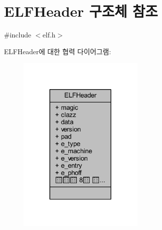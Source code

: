 \hypertarget{struct_e_l_f_header}{}\section{E\+L\+F\+Header 구조체 참조}
\label{struct_e_l_f_header}


{\ttfamily \#include $<$elf.\+h$>$}



E\+L\+F\+Header에 대한 협력 다이어그램\+:\nopagebreak
\begin{figure}[H]
\begin{center}
\leavevmode
\includegraphics[width=173pt]{struct_e_l_f_header__coll__graph}
\end{center}
\end{figure}
